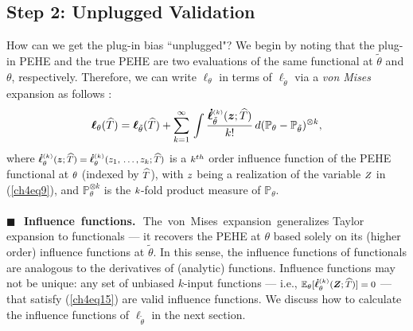 \documentclass [PhD] {uclathes}
\begin{document}
\subsection{Step 2: Unplugged Validation}
\label{ch4sec452}
How can we get the plug-in bias ``unplugged"? We begin by noting that the plug-in PEHE and the true PEHE are two evaluations of the same functional at \mbox{\footnotesize $\tilde{\theta}$} and \mbox{\footnotesize $\theta$}, respectively. Therefore, we can write \mbox{\footnotesize $\boldsymbol{\ell}_{\theta}$} in terms of \mbox{\footnotesize $\boldsymbol{\ell}_{\tilde{\theta}}$} via a {\it von Mises} expansion as follows \cite{fernholz2012mises}:  
\begin{align}
\boldsymbol{\ell}_{\theta}(\widehat{T}) = \boldsymbol{\ell}_{\tilde{\theta}}(\widehat{T}) + \sum_{k=1}^{\infty}\,\int\frac{\boldsymbol{\dot{\ell}}^{\mbox{\tiny $(k)$}}_{\tilde{\theta}}(\boldsymbol{z};\widehat{T})}{k!}\, d(\mathbb{P}_{\theta}-\mathbb{P}_{\tilde{\theta}})^{\otimes k}, 
\label{ch4eq15}
\end{align}
where $\mbox{\footnotesize $\boldsymbol{\dot{\ell}}^{\mbox{\tiny $(k)$}}_{\theta}(\boldsymbol{z};\widehat{T}) = \boldsymbol{\dot{\ell}}^{\mbox{\tiny $(k)$}}_{\theta}(z_1,\,.\,.\,.\,,z_k;\widehat{T})$}$ is a $\mbox{\footnotesize $k^{th}$}$ order influence function of the PEHE functional at $\mbox{\footnotesize $\theta$}$ (indexed by $\mbox{\footnotesize $\widehat{T}$}$), with $\mbox{\footnotesize $z$}$ being a realization of the variable $\mbox{\footnotesize $Z$}$ in (\ref{ch4eq9}), and \mbox{\footnotesize $\mathbb{P}_\theta^{\otimes k}$} is the $\mbox{\footnotesize $k$}$-fold product measure of \mbox{\footnotesize $\mathbb{P}_\theta$}.\\ 
\\
{\bf \mbox{\tiny $\blacksquare$}\,~Influence~functions.}\,~The~von~Mises~expansion~generalizes Taylor expansion to functionals --- it recovers the PEHE at \mbox{\footnotesize $\theta$} based solely on its (higher order) influence functions at \mbox{\footnotesize $\tilde{\theta}$}. In this sense, the influence functions of functionals are analogous to the derivatives of (analytic) functions. Influence functions may not be unique: any set of unbiased \mbox{\footnotesize $k$}-input functions --- i.e., $\mbox{\footnotesize $\mathbb{E}_{\theta}[\boldsymbol{\dot{\ell}}^{\mbox{\tiny $(k)$}}_{\theta}(\boldsymbol{Z};\widehat{T})]=0$}$ --- that satisfy (\ref{ch4eq15}) are valid influence functions. We discuss how to calculate the influence functions of \mbox{\footnotesize $\boldsymbol{\ell}_{\tilde{\theta}}$} in the next section. 
\end{document}
